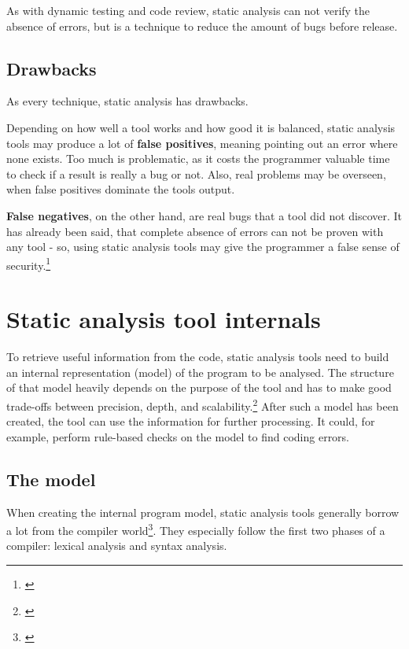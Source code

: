 As with dynamic testing and code review, static analysis can not verify the absence of errors, but is a technique to reduce the amount of bugs before release.

\subsection{Drawbacks}

As every technique, static analysis has drawbacks. 

Depending on how well a tool works and how good it is balanced, static analysis tools may produce a lot of \textbf{false positives}, meaning pointing out an error where none exists. Too much  is problematic, as it costs the programmer valuable time to check if a result is really a bug or not. Also, real problems may be overseen, when false positives dominate the tools output.

\textbf{False negatives}, on the other hand, are real bugs that a tool did not discover. It has already been said, that complete absence of errors can not be proven with any tool - so, using static analysis tools may give the programmer a false sense of security.\footnote{\citep[23]{SecureProgramming}}


\section{Static analysis tool internals}

To retrieve useful information from the code, static analysis tools need to build an internal representation (model) of the program to be analysed. The structure of that model heavily depends on the purpose of the tool and has to make good trade-offs between precision, depth, and scalability.\footnote{\citep[45]{SecureProgramming}} After such a model has been created, the tool can use the information for further processing. It could, for example, perform rule-based checks on the model to find coding errors.

\subsection{The model}

When creating the internal program model, static analysis tools generally borrow a lot from the compiler world\footnote{\citep[72]{SecureProgramming}}. They especially follow the first two phases of a compiler: lexical analysis and syntax analysis.

